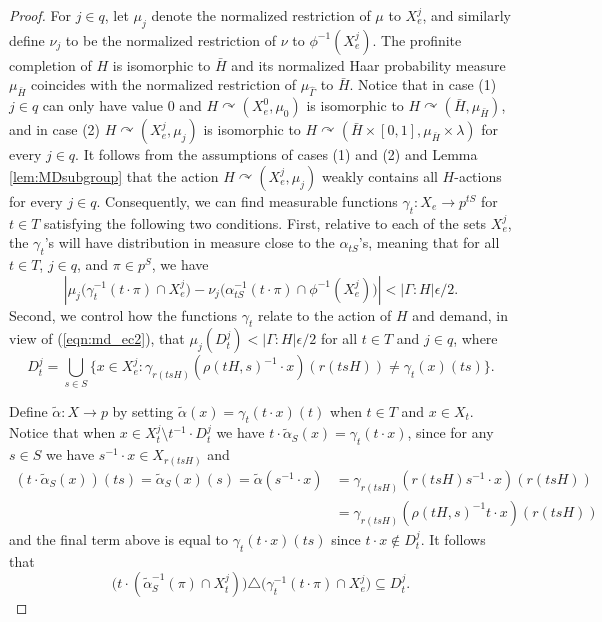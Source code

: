 \documentclass[12pt]{amsart}
\theoremstyle{definition}
\newcommand{\acts}{\curvearrowright}
\newcommand{\symd}{\triangle}
\begin{document}
\begin{proof}
	For $j \in q$, let $\mu_j$ denote the normalized restriction of $\mu$ to $X_{e}^j$, and similarly define $\nu_j$ to be the normalized restriction of $\nu$ to $\phi^{-1}(X_{e}^j)$. The profinite completion of $H$ is isomorphic to $\bar{H}$ and its normalized Haar probability measure $\mu_{\bar{H}}$ coincides with the normalized restriction of $\mu_{\hat{\Gamma}}$ to $\bar{H}$. Notice that in case (1) $j \in q$ can only have value $0$ and $H \acts (X_{e}^0, \mu_0)$ is isomorphic to $H \acts (\bar{H}, \mu_{\bar{H}})$, and in case (2) $H \acts (X_{e}^j, \mu_j)$ is isomorphic to $H \acts (\bar{H} \times [0, 1], \mu_{\bar{H}} \times \lambda)$ for every $j \in q$. It follows from the assumptions of cases (1) and (2) and Lemma \ref{lem:MDsubgroup} that the action $H \acts (X_{e}^j, \mu_j)$ weakly contains all $H$-actions for every $j \in q$. Consequently, we can find measurable functions $\gamma_t : X_{e} \rightarrow p^{t S}$ for $t \in T$ satisfying the following two conditions. First, relative to each of the sets $X_{e}^j$, the $\gamma_t$'s will have distribution in measure close to the $\alpha_{t S}$'s, meaning that for all $t \in T$, $j \in q$, and $\pi \in p^S$, we have
	\begin{equation} \label{eqn:md_ec3}
		\left|\mu_j \Big( \gamma_t^{-1}(t \cdot \pi) \cap X_{e}^j \Big) - \nu_j \Big( \alpha_{t S}^{-1}(t \cdot \pi) \cap \phi^{-1}(X_{e}^j) \Big)\right| < |\Gamma : H| \epsilon / 2.
	\end{equation}
	Second, we control how the functions $\gamma_t$ relate to the action of $H$ and demand, in view of (\ref{eqn:md_ec2}), that $\mu_j(D_t^j) < |\Gamma : H| \epsilon / 2$ for all $t \in T$ and $j \in q$, where
	\begin{equation*}
		D_t^j = \bigcup_{s \in S} \{x \in X_{e}^j:  \gamma_{r(t s H)}(\rho(t H, s)^{-1} \cdot x)(r(t s H)) \neq \gamma_t(x)(t s)\}.
	\end{equation*}
	
	Define $\tilde{\alpha} : X \rightarrow p$ by setting $\tilde{\alpha}(x) = \gamma_t(t \cdot x)(t)$ when $t \in T$ and $x \in X_t$. Notice that when $x \in X_t^j \setminus t^{-1} \cdot D_t^j$ we have $t \cdot \tilde{\alpha}_S(x) = \gamma_t(t \cdot x)$, since for any $s \in S$ we have $s^{-1} \cdot x \in X_{r(t s H)}$ and
	\begin{align*}
		(t \cdot \tilde{\alpha}_S(x))(t s) = \tilde{\alpha}_S(x)(s) = \tilde{\alpha}(s^{-1} \cdot x) & = \gamma_{r(t s H)}(r(t s H) s^{-1} \cdot x)(r(t s H))\\
		& = \gamma_{r(t s H)}(\rho(t H, s)^{-1} t \cdot x)(r(t s H))
	\end{align*}
	and the final term above is equal to $\gamma_t(t \cdot x)(t s)$ since $t \cdot x \not\in D_t^j$. It follows that
	\begin{equation} \label{eqn:md_ec4}
		\Big( t \cdot ( \tilde{\alpha}_S^{-1}(\pi) \cap X_t^j ) \Big) \symd \Big( \gamma_t^{-1}(t \cdot \pi) \cap X_{e}^j \Big) \subseteq D_t^j.
	\end{equation}
	

\end{proof}
\end{document}
